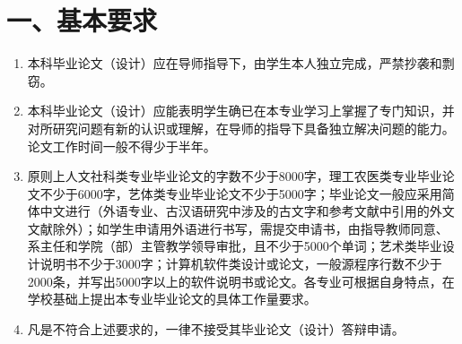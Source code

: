 \section*{一、基本要求}
\begin{enumerate}
  \item 本科毕业论文（设计）应在导师指导下，由学生本人独立完成，严禁抄袭和剽窃。
  \item 本科毕业论文（设计）应能表明学生确已在本专业学习上掌握了专门知识，并对所研究问题有新的认识或理解，在导师的指导下具备独立解决问题的能力。论文工作时间一般不得少于半年。
  \item 原则上人文社科类专业毕业论文的字数不少于8000字，理工农医类专业毕业论文不少于6000字，艺体类专业毕业论文不少于5000字；毕业论文一般应采用简体中文进行（外语专业、古汉语研究中涉及的古文字和参考文献中引用的外文文献除外）；如学生申请用外语进行书写，需提交申请书，由指导教师同意、系主任和学院（部）主管教学领导审批，且不少于5000个单词；艺术类毕业设计说明书不少于3000字；计算机软件类设计或论文，一般源程序行数不少于2000条，并写出5000字以上的软件说明书或论文。各专业可根据自身特点，在学校基础上提出本专业毕业论文的具体工作量要求。
  \item 凡是不符合上述要求的，一律不接受其毕业论文（设计）答辩申请。
\end{enumerate}

